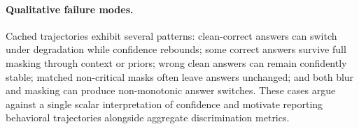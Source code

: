 \paragraph{Qualitative failure modes.}
Cached trajectories exhibit several patterns: clean-correct answers can switch under degradation while confidence rebounds; some correct answers survive full masking through context or priors; wrong clean answers can remain confidently stable; matched non-critical masks often leave answers unchanged; and both blur and masking can produce non-monotonic answer switches. These cases argue against a single scalar interpretation of confidence and motivate reporting behavioral trajectories alongside aggregate discrimination metrics.
